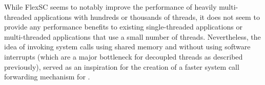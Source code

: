 While FlexSC seems to notably improve the performance of heavily multi-threaded
applications with hundreds or thousands of threads, it does not seem to provide
any performance benefits to existing single-threaded applications or
multi-threaded applications that use a small number of threads. Nevertheless,
the idea of invoking system calls using shared memory and without using
software interrupts (which are a major bottleneck for decoupled threads as
described previously), served as an inspiration for the creation of a faster
system call forwarding mechanism for \llinux.
